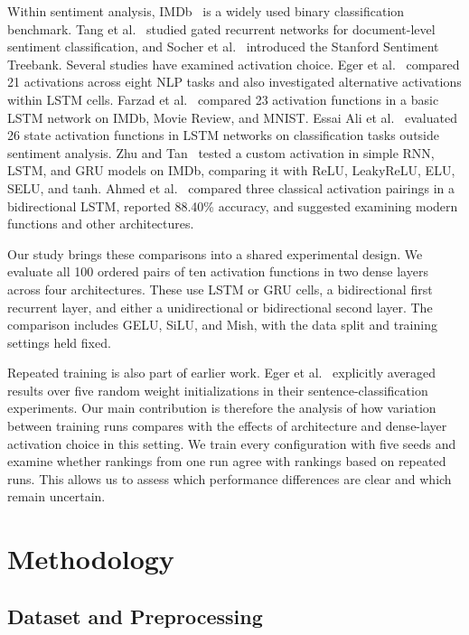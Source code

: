 \documentclass[conference,a4paper]{IEEEtran}
\begin{document}
Within sentiment analysis, IMDb~\cite{maas2011} is a widely
used binary classification benchmark. Tang et
al.~\cite{tang2015} studied gated recurrent networks for
document-level sentiment classification, and Socher et
al.~\cite{socher2013} introduced the Stanford Sentiment
Treebank. Several studies have examined activation choice.
Eger et al.~\cite{eger2018} compared 21 activations across
eight NLP tasks and also investigated alternative
activations within LSTM cells. Farzad et
al.~\cite{farzad2019} compared 23 activation functions in
a basic LSTM network on IMDb, Movie Review, and MNIST.
Essai Ali et al.~\cite{essaiAli2022} evaluated 26 state
activation functions in LSTM networks on classification
tasks outside sentiment analysis. Zhu and
Tan~\cite{zhu2022} tested a custom activation in simple RNN,
LSTM, and GRU models on IMDb, comparing it with ReLU,
LeakyReLU, ELU, SELU, and tanh. Ahmed et
al.~\cite{ahmed2025} compared three classical activation
pairings in a bidirectional LSTM, reported 88.40\% accuracy,
and suggested examining modern functions and other
architectures.

Our study brings these comparisons into a shared experimental
design. We evaluate all 100 ordered pairs of ten activation
functions in two dense layers across four architectures.
These use LSTM or GRU cells, a bidirectional first recurrent
layer, and either a unidirectional or bidirectional second
layer. The comparison includes GELU, SiLU, and Mish, with
the data split and training settings held fixed.

Repeated training is also part of earlier work. Eger et
al.~\cite{eger2018} explicitly averaged results over five
random weight initializations in their sentence-classification
experiments. Our main contribution is therefore the analysis
of how variation between training runs compares with the
effects of architecture and dense-layer activation choice
in this setting. We train every configuration with five
seeds and examine whether rankings from one run agree with
rankings based on repeated runs. This allows us to assess
which performance differences are clear and which remain
uncertain.%
\FloatBarrier
\section{Methodology}

\subsection{Dataset and Preprocessing}
\end{document}
